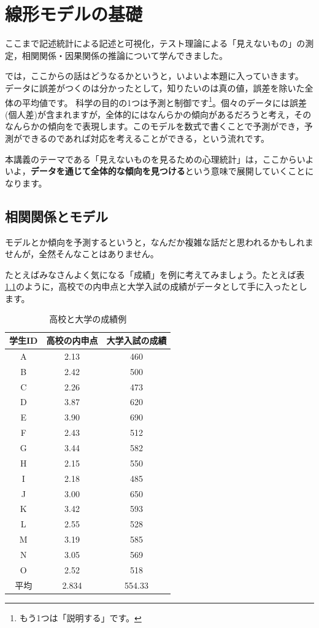 \documentclass{ltjbook}
\begin{document}
\chapter{線形モデルの基礎}
\label{m09_Regression}

ここまで記述統計による記述と可視化，テスト理論による「見えないもの」の測定，相関関係・因果関係の推論について学んできました。

では，ここからの話はどうなるかというと，いよいよ本題に入っていきます。
データに誤差がつくのは分かったとして，知りたいのは真の値，誤差を除いた全体の平均値です。
科学の目的の1つは予測と制御です\footnote{もう1つは「説明する」です。}。個々のデータには誤差(個人差)が含まれますが，全体的にはなんらかの傾向があるだろうと考え，そのなんらかの傾向をで表現します。このモデルを数式で書くことで予測ができ，予測ができるのであれば対応を考えることができる，という流れです。

本講義のテーマである「見えないものを見るための心理統計」は，ここからいよいよ，\textbf{データを通じて全体的な傾向を見つける}という意味で展開していくことになります。

\section{相関関係とモデル}
モデルとか傾向を予測するというと，なんだか複雑な話だと思われるかもしれませんが，全然そんなことはありません。

たとえばみなさんよく気になる「成績」を例に考えてみましょう。たとえば表\ref{tbl09_01}のように，高校での内申点と大学入試の成績がデータとして手に入ったとします。

\begin{table}[ht]
	\caption{高校と大学の成績例}
	\centering
	\begin{tabular}[t]{ccc}
		\hline
		学生ID & 高校の内申点 & 大学入試の成績 \\\hline
		A    & 2.13   & 460     \\
		B    & 2.42   & 500     \\
		C    & 2.26   & 473     \\
		D    & 3.87   & 620     \\
		E    & 3.90   & 690     \\
		F    & 2.43   & 512     \\
		G    & 3.44   & 582     \\
		H    & 2.15   & 550     \\
		I    & 2.18   & 485     \\
		J    & 3.00   & 650     \\
		K    & 3.42   & 593     \\
		L    & 2.55   & 528     \\
		M    & 3.19   & 585     \\
		N    & 3.05   & 569     \\
		O    & 2.52   & 518     \\\hline
		平均   & 2.834  & 554.33  \\
	\end{tabular}
	\label{tbl09_01}
\end{table}
\end{document}

